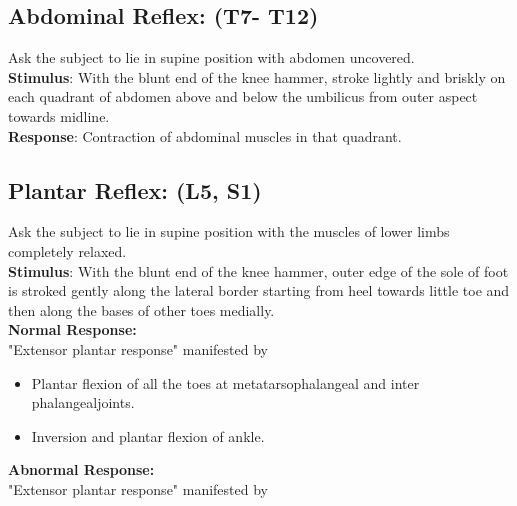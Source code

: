 \documentclass[a4paper,12pt,openany,oneside]{book}
\begin{document}
\subsection*{Abdominal Reflex: (T7- T12)}
Ask the subject to lie in supine position with abdomen uncovered.\\
\textbf{Stimulus}: With the blunt end of the knee hammer, stroke lightly and briskly on each quadrant of abdomen above and below the umbilicus from outer aspect towards midline.\\
\textbf{Response}: Contraction of abdominal muscles in that quadrant.
\subsection*{Plantar Reflex: (L5, S1)}
Ask the subject to lie in supine position with the muscles of lower limbs completely relaxed.\\
\textbf{Stimulus}: With the blunt end of the knee hammer, outer edge of the sole of foot is stroked gently along the lateral border starting from heel towards little toe and then along the bases of other toes medially.\\
\textbf{Normal Response: }\\
"Extensor plantar response" manifested by
\begin{itemize}
		\itemsep0em
\item{Plantar flexion of all the toes at metatarsophalangeal and inter phalangealjoints.}
\item{Inversion and plantar flexion of ankle.}
\end{itemize}
\textbf{Abnormal Response:}\\
"Extensor plantar response" manifested by
\end{document}
